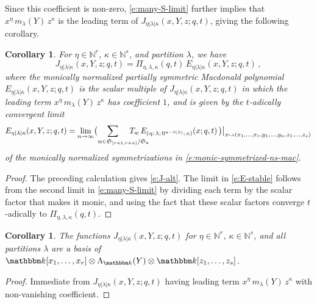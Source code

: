 \documentclass[12pt]{amsart}
\newtheorem{cor}[thm]{Corollary}
\theoremstyle{definition}
\theoremstyle{remark}
\newcommand{\NN}{{\mathbb N}}
\newcommand{\kk}{{\mathbbm k}}
\newcommand{\sS}{{\mathbf s}}
\newcommand{\Sfrak}{{\mathfrak S}}
\newcommand{\Jns}{J}           %
\begin{document}
Since this coefficient is non-zero, \eqref{e:many-S-limit} further
implies that $x^{\eta }\, m_{\lambda }(Y)\, z^{\kappa }$ is the
leading term of $\Jns _{\eta |\lambda |\kappa }(x,Y,z;q,t)$, giving the
following corollary.

\begin{cor}\label{cor:J-alt}
For $\eta \in \NN ^{r}$, $\kappa \in \NN ^{s}$, and partition $\lambda
$, we have
\begin{equation}\label{e:J-alt}
\Jns _{\eta |\lambda |\kappa }(x,Y,z;q,t) = \Pi _{\eta ,\lambda
,\kappa }(q,t)\, E_{\eta |\lambda |\kappa }(x,Y,z;q,t)\, ,
\end{equation}
where the monically normalized partially symmetric Macdonald
polynomial $E_{\eta |\lambda |\kappa }(x,Y,z;q,t)$ is the scalar
multiple of $\Jns _{\eta |\lambda |\kappa }(x,Y,z;q,t)$ in which the
leading term $x^{\eta }\, m_{\lambda }(Y)\, z^{\kappa }$ has
coefficient $1$, and is given by the $t$-adically convergent limit
\begin{equation}\label{e:E-stable}
E_{\eta |\lambda |\kappa }(x,Y,z;q,t)
= \lim_{n\rightarrow \infty } \bigl( \sum _{w \in \Sfrak _{[r+1,r+n]}/
\Sfrak _{\sS } \hspace{-6ex}} T_{w}\, E _{(\eta ;\, \lambda ;\,
0^{n-\ell(\lambda )};\, \kappa )}(x;q,t)\, \bigr) \bigr|_{x\mapsto
(x_{1},\ldots,x_{r}, y_{1},\ldots,y_{n}, z_{1},\ldots,z_{s})}
\end{equation}
of the monically normalized symmetrizations in
\eqref{e:monic-symmetrized-ns-mac}.
\end{cor}

\begin{proof}
The preceding calculation gives \eqref{e:J-alt}.  The limit in
\eqref{e:E-stable} follows from the second limit in
\eqref{e:many-S-limit} by dividing each term by the scalar factor that
makes it monic, and using the fact that these scalar factors converge
$t$-adically to $\Pi _{\eta ,\lambda ,\kappa }(q,t)$.
\end{proof}

\begin{cor}\label{cor:basis}
The functions $\Jns _{\eta |\lambda |\kappa }(x,Y,z;q,t)$ for $\eta \in \NN
^{r}$, $\kappa \in \NN ^{s}$, and all partitions $\lambda $ are a
basis of $\kk [x_{1},\ldots,x_{r}] \otimes \Lambda _{\kk }(Y)\otimes
\kk [z_{1},\ldots,z_{s}]$.
\end{cor}

\begin{proof}
Immediate from $\Jns _{\eta |\lambda |\kappa }(x,Y,z;q,t)$
having leading term $x^{\eta }\, m_{\lambda }(Y)\, z^{\kappa }$ with
non-vanishing coefficient.
\end{proof}
\end{document}
